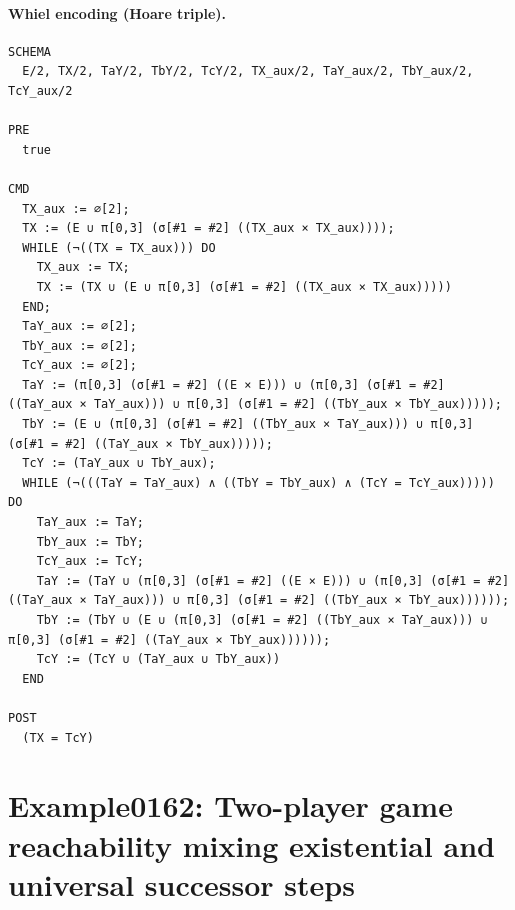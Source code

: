 \documentclass[10pt]{article}
\begin{document}
\paragraph{Whiel encoding (Hoare triple).}

\begin{Verbatim}[fontsize=\scriptsize,breaklines=true,breakanywhere=true,frame=single,framesep=1.5mm]
SCHEMA
  E/2, TX/2, TaY/2, TbY/2, TcY/2, TX_aux/2, TaY_aux/2, TbY_aux/2, TcY_aux/2

PRE
  true 

CMD
  TX_aux := ∅[2];
  TX := (E ∪ π[0,3] (σ[#1 = #2] ((TX_aux × TX_aux))));
  WHILE (¬((TX = TX_aux))) DO
    TX_aux := TX;
    TX := (TX ∪ (E ∪ π[0,3] (σ[#1 = #2] ((TX_aux × TX_aux)))))
  END;
  TaY_aux := ∅[2];
  TbY_aux := ∅[2];
  TcY_aux := ∅[2];
  TaY := (π[0,3] (σ[#1 = #2] ((E × E))) ∪ (π[0,3] (σ[#1 = #2] ((TaY_aux × TaY_aux))) ∪ π[0,3] (σ[#1 = #2] ((TbY_aux × TbY_aux)))));
  TbY := (E ∪ (π[0,3] (σ[#1 = #2] ((TbY_aux × TaY_aux))) ∪ π[0,3] (σ[#1 = #2] ((TaY_aux × TbY_aux)))));
  TcY := (TaY_aux ∪ TbY_aux);
  WHILE (¬(((TaY = TaY_aux) ∧ ((TbY = TbY_aux) ∧ (TcY = TcY_aux))))) DO
    TaY_aux := TaY;
    TbY_aux := TbY;
    TcY_aux := TcY;
    TaY := (TaY ∪ (π[0,3] (σ[#1 = #2] ((E × E))) ∪ (π[0,3] (σ[#1 = #2] ((TaY_aux × TaY_aux))) ∪ π[0,3] (σ[#1 = #2] ((TbY_aux × TbY_aux))))));
    TbY := (TbY ∪ (E ∪ (π[0,3] (σ[#1 = #2] ((TbY_aux × TaY_aux))) ∪ π[0,3] (σ[#1 = #2] ((TaY_aux × TbY_aux))))));
    TcY := (TcY ∪ (TaY_aux ∪ TbY_aux))
  END

POST
  (TX = TcY)
\end{Verbatim}

\Needspace{0.45\textheight}

\section{Example0162: Two-player game reachability mixing existential and universal successor steps}\label{case:Example0162}
\end{document}
